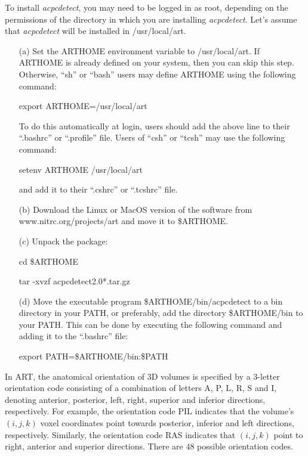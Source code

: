 \documentclass[11pt]{article}
\begin{document}
To install {\it acpcdetect}, you may need 
to be logged in as root, depending on the permissions of the directory in which
you are installing {\it acpcdetect}. Let's assume that {\it acpcdetect} will be installed in
/usr/local/art.
\begin{itemize}
\item[(a)] Set the ARTHOME environment variable to /usr/local/art. If ARTHOME is already
defined on your system, then you can skip this step. Otherwise, ``sh'' or ``bash'' users may define
ARTHOME using the following command: 

export ARTHOME=/usr/local/art 

To do this automatically at login, users should add the above line to their ``.bashrc'' or ``.profile''
file. Users of ``csh'' or ``tcsh'' may use the following command:

setenv ARTHOME /usr/local/art 

and add it to their ``.cshrc'' or ``.tcshrc'' file.

\item[(b)] Download the Linux or MacOS version of the software from www.nitrc.org/projects/art and
move it to \$ARTHOME.

\item[(c)] Unpack the package:

cd \$ARTHOME

tar -xvzf acpcdetect2.0*.tar.gz

\item[(d)] Move the executable program \$ARTHOME/bin/acpcdetect to a bin directory in your PATH, or
preferably, add the directory \$ARTHOME/bin to your PATH. This can be done by executing the
following command and adding it to the ``.bashrc'' file:

export PATH=\$ARTHOME/bin:\$PATH

\end{itemize}

In ART, the anatomical orientation of 3D volumes is specified by a 3-letter orientation 
code consisting of a combination of letters A, P, L, R, S and I, denoting anterior, 
posterior, left, right, superior and inferior directions, respectively.  For example, 
the orientation code PIL indicates that the volume's $(i, j, k)$ voxel coordinates point 
towards posterior, inferior and left directions, respectively. Similarly, the orientation 
code RAS indicates that $(i, j, k)$ point to right, anterior and superior directions. 
There are 48 possible orientation codes. 
\vspace{3mm}
\end{document}
